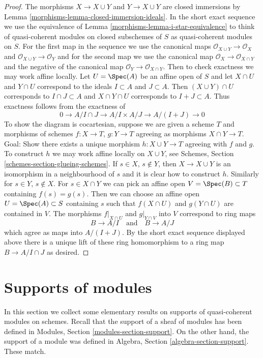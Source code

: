 \begin{proof}

The morphisms $X \to X \cup Y$ and $Y \to X \cup Y$ are closed immersions
by Lemma \ref{morphisms-lemma-closed-immersion-ideals}. In the short exact sequence
we use the equivalence of Lemma \ref{morphisms-lemma-i-star-equivalence} to think of
quasi-coherent modules on closed subschemes of $S$ as quasi-coherent modules
on $S$. For the first map in the sequence we use the canonical maps
$\mathcal{O}_{X \cup Y} \to \mathcal{O}_X$ and
$\mathcal{O}_{X \cup Y} \to \mathcal{O}_Y$
and for the second map we use the canonical map
$\mathcal{O}_X \to \mathcal{O}_{X \cap Y}$ and
the negative of the canonical map
$\mathcal{O}_Y \to \mathcal{O}_{X \cap Y}$. Then to check
exactness we may work affine locally.
Let $U = \Spec(A)$ be an affine open of $S$ and let $X \cap U$ and $Y \cap U$
correspond to the ideals $I \subset A$ and $J \subset A$. Then
$(X \cup Y) \cap U$ corresponds to $I \cap J \subset A$
and $X \cap Y \cap U$ corresponds to $I + J \subset A$.
Thus exactness follows from the exactness of
$$
0 \to A/I \cap J \to A/I \times A/J \to A/(I + J) \to 0
$$
To show the diagram is cocartesian, suppose we are given a scheme $T$
and morphisms of schemes $f : X \to T$, $g : Y \to T$ agreeing
as morphisms $X \cap Y \to T$. Goal: Show there exists a unique
morphism $h : X \cup Y \to T$ agreeing with $f$ and $g$.
To construct $h$ we may work affine locally on $X \cup Y$, see
Schemes, Section \ref{schemes-section-glueing-schemes}.
If $s \in X$, $s \not \in Y$, then $X \to X \cup Y$ is
an isomorphism in a neighbourhood of $s$ and it is clear
how to construct $h$. Similarly for $s \in Y$, $s \not \in X$.
For $s \in X \cap Y$ we can pick an affine open
$V = \Spec(B) \subset T$ containing $f(s) = g(s)$.
Then we can choose an affine open $U = \Spec(A) \subset S$
containing $s$ such that $f(X \cap U)$ and $g(Y \cap U)$
are contained in $V$. The morphisms $f|_{X \cap U}$
and $g|_{Y \cap V}$ into $V$ correspond to ring maps
$$
B \to A/I
\quad\text{and}\quad
B \to A/J
$$
which agree as maps into $A/(I + J)$. By the short exact sequence
displayed above there is a unique lift of these ring homomorphism
to a ring map $B \to A/I \cap J$ as desired.
\end{proof}

\section{Supports of modules}
\label{morphisms-section-support}
In this section we collect some elementary results on supports of
quasi-coherent modules on schemes.
Recall that the support of a sheaf of modules has been defined in
Modules, Section \ref{modules-section-support}.
On the other hand, the support of a module was defined in
Algebra, Section \ref{algebra-section-support}.
These match.

